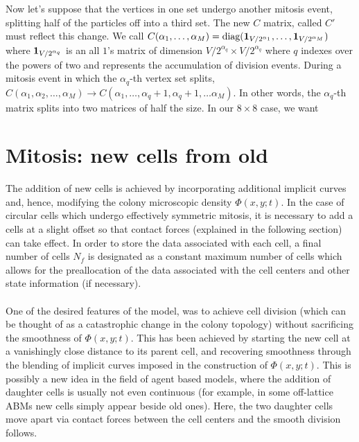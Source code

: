 Now let's suppose that the vertices in one set undergo another mitosis event, splitting half of the particles
off into a third set. The new $C$ matrix, called $C'$ must reflect this change. We call 
$C(\alpha_1, \ldots, \alpha_M) = \textrm{diag}(\vb{1}_{V/2^{\alpha_1}}, \ldots,\vb{1}_{V/2^{\alpha_M}} )$ where $\vb{1}_{V/2^{\alpha_q}}$
is an all $1$'s matrix of dimension $V/2^{\alpha_q} \times V/2^{\alpha_q}$ where $q$ indexes over the powers 
of two and represents the accumulation of division events. During a mitosis event in which the $\alpha_q$-th vertex set
splits, $C(\alpha_1, \alpha_2, \ldots, \alpha_M) \rightarrow 
C(\alpha_1, \ldots, \alpha_q+1,\alpha_q+1 , \ldots\alpha_M)$. In other words, the $\alpha_q$-th matrix splits into
two matrices of half the size. In our $8 \times 8$ case, we want



\section{Mitosis: new cells from old}

The addition of new cells is achieved by incorporating additional implicit curves and, hence, modifying the colony microscopic density $\Phi(x,y;t) $. In the case of circular cells which undergo effectively symmetric mitosis, it is necessary to add a cells at a slight offset so that contact forces (explained in the following section) can take effect. In order to store the data associated with each cell, a final number of cells $N_f$ is designated as a constant maximum number of cells which allows for the preallocation of the data associated with the cell centers and other state information (if necessary). 
\\
\\
One of the desired features of the model, was to achieve cell division (which can be thought of as a catastrophic change in the colony topology)  without sacrificing the smoothness of $\Phi(x,y;t) $. This has been achieved by starting the new cell at a vanishingly close distance to its parent cell, and recovering smoothness through the blending of implicit curves imposed in the construction of $\Phi(x,y;t)$. This is possibly a new idea in the field of agent based models, where the addition of daughter cells is usually not even continuous (for example, in some off-lattice ABMs new cells simply appear beside old ones). Here, the two daughter cells move apart via contact forces between the cell centers and the smooth division follows.

